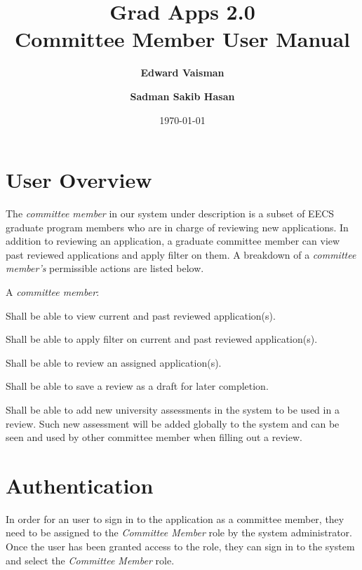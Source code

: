 \documentclass[fontsize=12pt,paper=letter,twoside]{scrartcl}
\author{\textbf{Edward Vaisman}
\and \textbf{Sadman Sakib Hasan}
}
\date{\today} %
\begin{document}
\title{Grad Apps 2.0 \\ Committee Member User Manual}
\maketitle

\newpage

\tableofcontents
\listoffigures
\listoftables
\newpage



\clearpage
\section{User Overview}

The \emph{committee member} in our system under description is a subset of EECS graduate program members who are in charge of reviewing new applications. In addition to reviewing an application, a graduate committee member can view past reviewed applications and apply filter on them. A breakdown of a \emph{committee member's} permissible actions are listed below.

\smallskip
\noindent A \emph{committee member}:

\begin{mylist}
\item Shall be able to view current and past reviewed application(s).
\item Shall be able to apply filter on current and past reviewed application(s).
\item Shall be able to review an assigned application(s).
\item Shall be able to save a review as a draft for later completion.
\item Shall be able to add new university assessments in the system to be used in a review. Such new assessment will be added globally to the system and can be seen and used by other committee member when filling out a review.
\end{mylist}

\section{Authentication}

In order for an user to sign in to the application as a committee member, they need to be assigned to the \emph{Committee Member} role by the system administrator. Once the user has been granted access to the role, they can sign in to the system and select the \emph{Committee Member} role.
\end{document}

